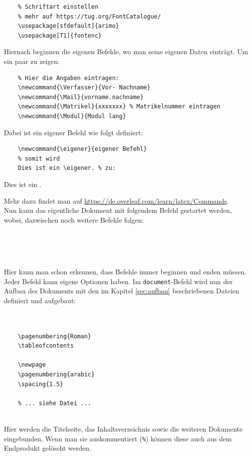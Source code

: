 \begin{verbatim}
    % Schriftart einstellen
    % mehr auf https://tug.org/FontCatalogue/
    \usepackage[sfdefault]{arimo}
    \usepackage[T1]{fontenc}
\end{verbatim}

Hiernach beginnen die eigenen Befehle, wo man seine eigenen Daten einträgt. Um ein paar zu zeigen:

\begin{verbatim}
    % Hier die Angaben eintragen:
    \newcommand{\Verfasser}{Vor- Nachname}
    \newcommand{\Mail}{vorname.nachname}
    \newcommand{\Matrikel}{xxxxxxx} % Matrikelnummer eintragen
    \newcommand{\Modul}{Modul lang}
\end{verbatim}

Dabei ist ein eigener Befehl wie folgt definiert: 

\begin{verbatim}
    \newcommand{\eigener}{eigener Befehl}
    % somit wird
    Dies ist ein \eigener. % zu:
\end{verbatim}

Dies ist ein \eigener.

Mehr dazu findet man auf \url{https://de.overleaf.com/learn/latex/Commands}.\\

Nun kann das eigentliche Dokument mit folgendem Befehl gestartet werden, wobei, dazwischen noch weitere Befehle folgen:

\begin{verbatim}
    
    
    
\end{verbatim}

Hier kann man schon erkennen, dass Befehle immer beginnen und enden müssen. Jeder Befehl kann eigene Optionen haben. Im \verb|document|-Befehl wird nun der Aufbau des Dokuments mit den im Kapitel \ref{sec:aufbau} beschriebenen Dateien definiert und aufgebaut:

\begin{verbatim}
    

    \pagenumbering{Roman}
    \tableofcontents
    
    \newpage
    \pagenumbering{arabic}
    \spacing{1.5}
    
    % ... siehe Datei ...
    
\end{verbatim}

Hier werden die Titelseite, das Inhaltsverzeichnis sowie die weiteren Dokumente eingebunden. Wenn man sie auskommentiert (\verb|%|) können diese auch aus dem Endprodukt \glqq gelöscht\grqq{} werden.


